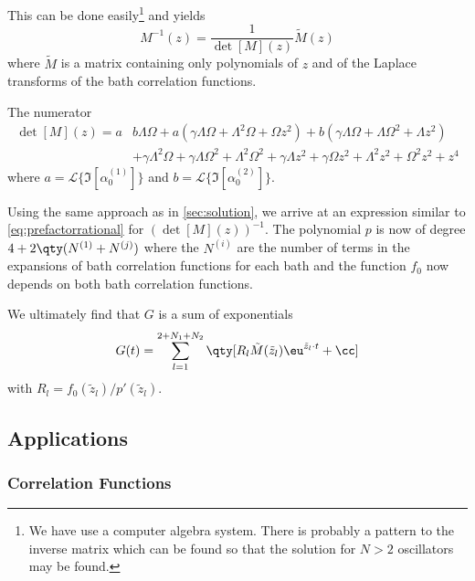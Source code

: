 This can be done easily\footnote{We have use a computer algebra
  system. There is probably a pattern to the inverse matrix which can
  be found so that the solution for \(N>2\) oscillators may be found.}
and yields
\begin{equation}
  \label{eq:minvtwo}
  M^{-1}(z) = \frac{1}{\det[M](z)} \tilde{M}(z)
 \end{equation}
where \(\tilde{M}\) is a matrix containing only polynomials of \(z\)
and of the Laplace transforms of the bath correlation functions.

The numerator
\begin{equation}
  \label{eq:numerator}
  \begin{aligned}
  \det[M](z)=a& b \Lambda  \Omega +a \left(\gamma
    \Lambda  \Omega +\Lambda ^2 \Omega +\Omega  z^2\right)
  +b
  \left(\gamma \Lambda  \Omega +\Lambda  \Omega ^2+\Lambda  z^2\right)\\
  &+\gamma  \Lambda ^2 \Omega +\gamma  \Lambda
   \Omega ^2+\Lambda ^2 \Omega ^2+\gamma  \Lambda  z^2+\gamma  \Omega  z^2+\Lambda ^2 z^2+\Omega ^2 z^2+z^4
  \end{aligned}
\end{equation}
where \(a=\mathcal{L}\{\Im[α^{(1)}_0]\}\) and \(b=\mathcal{L}\{\Im[α^{(2)}_0]\}\).

Using the same approach as in \cref{sec:solution}, we arrive at an
expression similar to \cref{eq:prefactorrational} for
\((\det[M](z))^{-1}\). The polynomial \(p\) is now of degree
\(4 + 2 \qty(N^{(1)} + N^{(j)})\) where the \(N^{(i)}\) are the number of
terms in the expansions of bath correlation functions for each bath
and the function \(f_0\) now depends on both bath correlation
functions.

We ultimately find that \(G\) is a sum of
exponentials
\begin{equation}
  \label{eq:gfinal}
  G(t) = \sum_{l=1}^{2+N_1+N_2}\qty[R_l \tilde{M}(\tilde{z}_l)\eu^{\tilde{z}_l \cdot
    t} + \cc]
\end{equation}
with \(R_l={f_0(\tilde{z}_l)}/{p'(\tilde{z}_l)}\).

\subsection{Applications}
\subsubsection{Correlation Functions}
\label{sec:correltwo}

